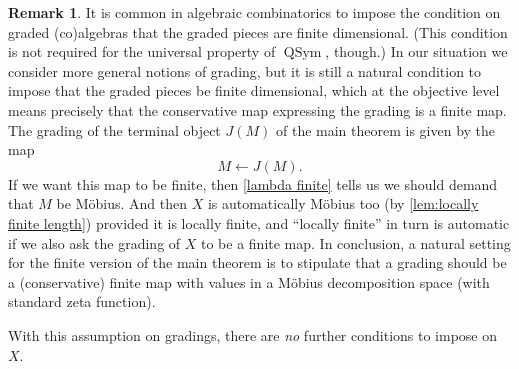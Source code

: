 \documentclass{amsart}
\newcommand{\QSym}{\operatorname{QSym}}
\theoremstyle{definition}
\newtheorem{remark}[theorem]{Remark}
\theoremstyle{noname}
\begin{document}
\begin{remark}
  It is common in algebraic combinatorics to impose the condition
  on graded (co)algebras that the graded pieces are finite dimensional. (This 
  condition is
  not required for the universal property of $\QSym$, though.) In our situation we
  consider more general notions of grading, but it is still a natural condition to
  impose that the graded pieces be finite dimensional, which at the objective level
  means precisely that the conservative map expressing the grading is a finite map. The grading
  of the terminal object $J(M)$ of the main theorem is given by the map
  $$
  M \leftarrow J(M) .
  $$
  If we want this map to be finite, then \cref{lambda finite} tells us we should
  demand that $M$ be M\"obius. And then $X$ is automatically M\"obius too (by
  \cref{lem:locally finite length}) provided it is locally finite, and 
  ``locally finite'' 
  in turn is automatic if we also ask the grading of $X$ to be a finite map. In
  conclusion, a natural setting for the finite version of the main theorem is to
  stipulate that a grading should be a (conservative) finite map with values in a
  M\"obius decomposition space (with standard zeta function).
  
  With this assumption on gradings, there are {\em no} further conditions to impose on $X$.
\end{remark}
\end{document}

